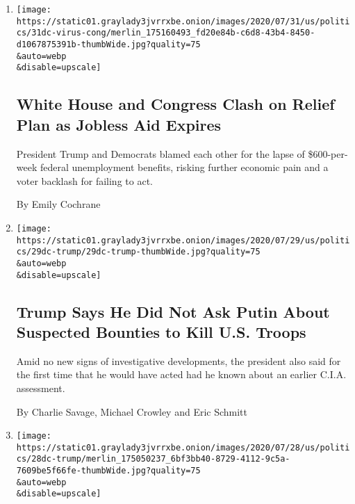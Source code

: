 \begin{enumerate}
\def\labelenumi{\arabic{enumi}.}
\item
  \href{/2020/07/31/us/politics/white-house-congress-relief-plan-jobless-aid.html}{}

  \texttt{[image: https://static01.graylady3jvrrxbe.onion/images/2020/07/31/us/politics/31dc-virus-cong/merlin\_175160493\_fd20e84b-c6d8-43b4-8450-d1067875391b-thumbWide.jpg?quality=75\\\&auto=webp\\\&disable=upscale]}

  \hypertarget{white-house-and-congress-clash-on-relief-plan-as-jobless-aid-expires}{%
  \subsection{White House and Congress Clash on Relief Plan as Jobless
  Aid
  Expires}\label{white-house-and-congress-clash-on-relief-plan-as-jobless-aid-expires}}

  President Trump and Democrats blamed each other for the lapse of
  \$600-per-week federal unemployment benefits, risking further economic
  pain and a voter backlash for failing to act.

  By Emily Cochrane
\item
  \href{/2020/07/29/us/politics/trump-putin-bounties.html}{}

  \texttt{[image: https://static01.graylady3jvrrxbe.onion/images/2020/07/29/us/politics/29dc-trump/29dc-trump-thumbWide.jpg?quality=75\\\&auto=webp\\\&disable=upscale]}

  \hypertarget{trump-says-he-did-not-ask-putin-about-suspected-bounties-to-kill-us-troops}{%
  \subsection{Trump Says He Did Not Ask Putin About Suspected Bounties
  to Kill U.S.
  Troops}\label{trump-says-he-did-not-ask-putin-about-suspected-bounties-to-kill-us-troops}}

  Amid no new signs of investigative developments, the president also
  said for the first time that he would have acted had he known about an
  earlier C.I.A. assessment.

  By Charlie Savage, Michael Crowley and Eric Schmitt
\item
  \href{/2020/07/28/us/politics/trump-nobody-likes-me-walks-out-briefing.html}{}

  \texttt{[image: https://static01.graylady3jvrrxbe.onion/images/2020/07/28/us/politics/28dc-trump/merlin\_175050237\_6bf3bb40-8729-4112-9c5a-7609be5f66fe-thumbWide.jpg?quality=75\\\&auto=webp\\\&disable=upscale]}


\end{enumerate}
